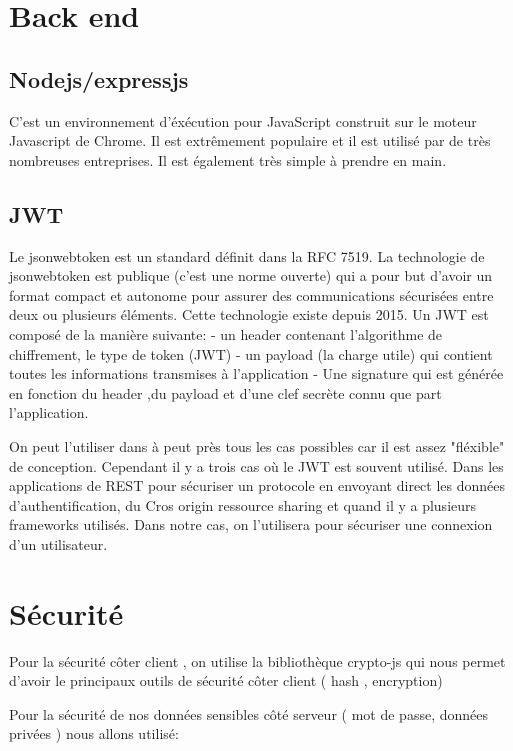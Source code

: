 \documentclass[a4paper,12pt]{report}
\begin{document}
\section{Back end}

\subsection{Nodejs/expressjs}
C'est un environnement d'éxécution pour JavaScript construit sur le moteur Javascript de Chrome. Il est extrêmement populaire et il est utilisé par de très nombreuses entreprises. Il est également très simple à prendre en main.

\subsection{JWT}

Le jsonwebtoken est un standard définit dans la RFC 7519. 
La technologie de jsonwebtoken est publique (c'est une norme ouverte) qui a pour but d'avoir un format compact et autonome pour assurer des communications sécurisées entre deux ou plusieurs éléments.
Cette technologie existe depuis 2015.
Un JWT est composé de la manière suivante:
- un header contenant l'algorithme de chiffrement, le type de token (JWT)
- un payload (la charge utile) qui contient toutes les informations transmises à l'application
- Une signature qui est générée en fonction du header ,du payload et d'une clef secrète connu que part l'application.

On peut l'utiliser dans à peut près tous les cas possibles car il est assez "fléxible" de conception. Cependant il y a trois cas où le JWT est souvent utilisé.
Dans les applications de REST pour sécuriser un protocole en envoyant direct les données d'authentification, du Cros origin ressource sharing et quand il y a plusieurs frameworks utilisés. 
Dans notre cas, on l'utilisera pour sécuriser une connexion d'un utilisateur.

\section{Sécurité}

 Pour la sécurité côter client , on utilise la bibliothèque crypto-js qui nous permet d'avoir le principaux outils de sécurité côter client ( hash , encryption)

Pour la sécurité de nos données sensibles côté serveur ( mot de passe, données privées ) nous allons utilisé:
\end{document}
